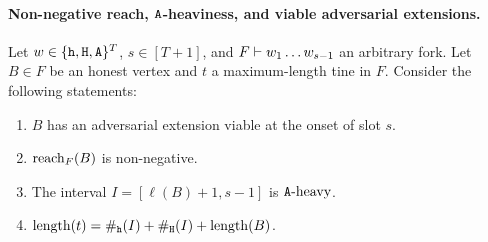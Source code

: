 \paragraph{Non-negative reach, $\mathtt{A}$-heaviness, and viable adversarial extensions.}
Let $w \in \{\mathtt{h}, \mathtt{H}, \mathtt{A}\}^T$,   
$s \in [T + 1]$, and 
$F \vdash w_1 \ldots w_{s - 1}$ an arbitrary fork. 
Let $B \in F$ be an honest vertex 
and $t$ a maximum-length tine in $F$.
Consider the following statements: 
\begin{enumerate}[label=(\alph*)]
  \item \label{fact-reach-part:viable-adv-ext} $B$ has an adversarial extension viable at the onset of slot $s$.
  \item \label{fact-reach-part:nonneg-reach} $\operatorname{reach}_{F}(B)$ is non-negative.
  \item \label{fact-reach-part:Aheavy} The interval $I = [\ell(B) + 1, s - 1]$ is $\mathtt{A}\text{-heavy}$. 
  \item \label{fact-reach-part:conservative} $\operatorname{length}(t) = \#_{\mathtt{h}}(I) + \#_{\mathtt{H}}(I) + \operatorname{length}(B)$.     
\end{enumerate}

